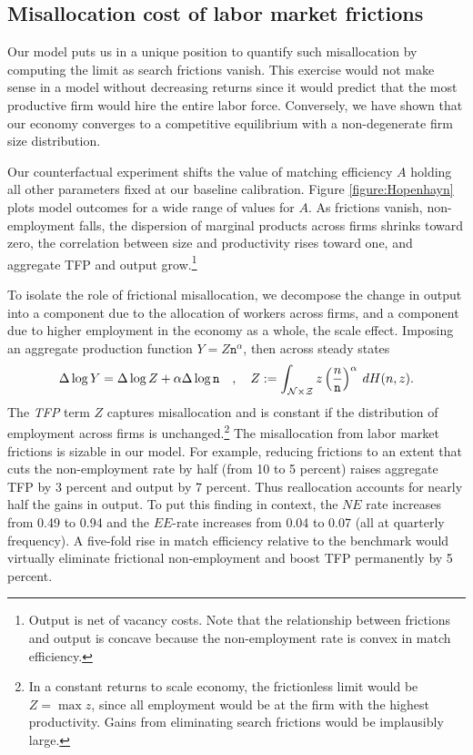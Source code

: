 \subsection{Misallocation cost of labor market frictions}
Our model puts us in a unique position to quantify such misallocation by computing the limit as search frictions vanish.
This exercise would not make sense in a model without decreasing returns since it would predict that the most productive firm would hire the entire labor force.
Conversely, we have shown that our economy converges to a competitive equilibrium with a non-degenerate firm size distribution.

Our counterfactual experiment shifts the value of matching efficiency $A$ holding all other parameters fixed at our baseline calibration.
Figure \ref{figure:Hopenhayn} plots model outcomes for a wide range of values for $A$.
As frictions vanish, non-employment falls, the dispersion of marginal products across firms shrinks toward zero, the correlation between size and productivity rises toward one, and aggregate TFP and output grow.\footnote{
    Output is net of vacancy costs. Note that the relationship between frictions and output is concave because the non-employment rate is convex in match efficiency.}

To isolate the role of frictional misallocation, we decompose the change in output into a component due to the allocation of workers across firms, and a component due to higher employment in the economy as a whole, the scale effect.
Imposing an aggregate production function $Y=Z\mathtt{{n}}^\alpha$, then across steady states
\vspace*{-.1cm}\begin{equation*}
\Delta\log{Y} = \Delta\log{Z} + \alpha\Delta\log{\mathtt{{n}}}\quad,\quad Z := \int_{\mathcal{N}\times\mathcal{Z}} z\left(\frac{n}{\mathtt{{n}}}\right)^\alpha\:dH(n,z).
\vspace*{-.1cm}\end{equation*}
The \emph{TFP} term $Z$ captures misallocation and is constant if the distribution of employment across firms is unchanged.\footnote{
    In a constant returns to scale economy, the frictionless limit would be $Z=\max {z}$, since all employment would be at the firm with the highest productivity. Gains from eliminating search frictions would be implausibly large.
}
The misallocation from labor market frictions is sizable in our model.
For example, reducing frictions to an extent that cuts the non-employment rate by half (from 10 to 5 percent) raises aggregate TFP by 3 percent and output by 7 percent. Thus reallocation accounts for nearly half the gains in output. To put this finding in context, the $NE$ rate increases from 0.49 to 0.94 and the $EE$-rate increases from 0.04 to 0.07 (all at quarterly frequency). A five-fold rise in match efficiency relative to the benchmark would virtually eliminate frictional non-employment and boost TFP permanently by 5 percent.

